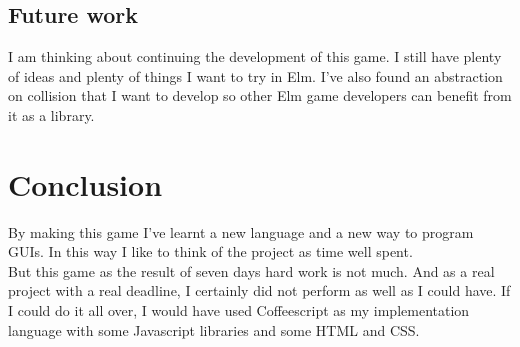 \documentclass[a4paper]{article}
\begin{document}
\subsection{Future work}
I am thinking about continuing the development of this game. I still have
 plenty of ideas and plenty of things I want to try in Elm. I've also found
 an abstraction on collision that I want to develop so other Elm game
 developers can benefit from it as a library. 

\section{Conclusion}
By making this game I've learnt a new language and a new way to program GUIs. In
 this way I like to think of the project as time well spent. \\
But this game as the result of seven days hard work is not much. And as a real
 project with a real deadline, I certainly did not perform as well as I could
 have. If I could do it all over, I would have used Coffeescript as my
 implementation language with some Javascript libraries and some HTML and CSS.
 

\newpage




\end{document}
